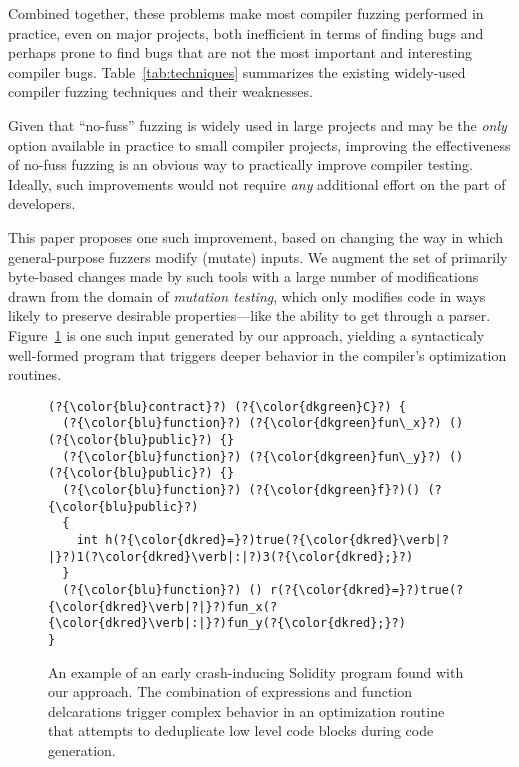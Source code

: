   Combined together, these problems make most compiler fuzzing
  performed in practice, even on major projects, both inefficient in
  terms of finding bugs and perhaps prone to find bugs that are not
  the most important and interesting compiler bugs.
  Table~\ref{tab:techniques} summarizes the existing widely-used
  compiler fuzzing techniques and their weaknesses.

  Given that ``no-fuss'' fuzzing is widely used in large projects and
  may be the \emph{only} option available in
  practice to small compiler projects, improving the effectiveness of no-fuss fuzzing is an obvious way to practically improve compiler
  testing.  Ideally, such improvements would not require \emph{any}
  additional effort on the part of developers.

  This paper proposes one such improvement, based on changing the way
  in which general-purpose fuzzers modify (mutate) inputs.  We augment
  the set of primarily byte-based changes made by such tools with a large number of
  modifications drawn from the domain of \emph{mutation testing},
  which only modifies code in ways likely to preserve desirable
  properties---like the ability to get through a parser. Figure~\ref{lst:sol-exemplar}
  is one such input generated by our approach, yielding a syntacticaly well-formed program that
  triggers deeper behavior in the compiler's optimization routines.

\begin{figure}[h!]
\begin{lstlisting}[basicstyle=\scriptsize\ttfamily,numbers=none,xleftmargin=0.7em,xrightmargin=.7em]
(?{\color{blu}contract}?) (?{\color{dkgreen}C}?) {
  (?{\color{blu}function}?) (?{\color{dkgreen}fun\_x}?) () (?{\color{blu}public}?) {}
  (?{\color{blu}function}?) (?{\color{dkgreen}fun\_y}?) () (?{\color{blu}public}?) {}
  (?{\color{blu}function}?) (?{\color{dkgreen}f}?)() (?{\color{blu}public}?)
  {
    int h(?{\color{dkred}=}?)true(?{\color{dkred}\verb|?|}?)1(?\color{dkred}\verb|:|?)3(?{\color{dkred};}?)
  }
  (?{\color{blu}function}?) () r(?{\color{dkred}=}?)true(?{\color{dkred}\verb|?|}?)fun_x(?{\color{dkred}\verb|:|}?)fun_y(?{\color{dkred};}?)
}
\end{lstlisting}
\caption{An example of an early crash-inducing Solidity program found with our approach. The combination of expressions and function delcarations trigger complex behavior in an optimization routine that attempts to deduplicate low level code blocks during code generation.}
\label{lst:sol-exemplar}
\end{figure}

